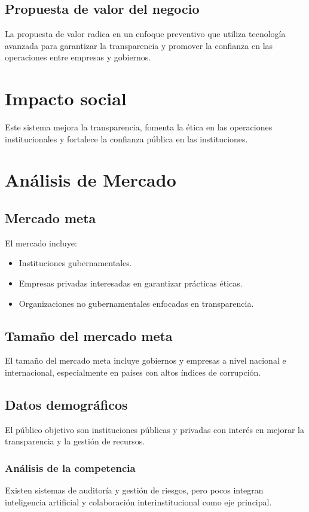 \documentclass[a4paper,12pt]{article}
\begin{document}
\subsection{Propuesta de valor del negocio}
La propuesta de valor radica en un enfoque preventivo que utiliza tecnología avanzada para garantizar la transparencia y promover la confianza en las operaciones entre empresas y gobiernos.

\section{Impacto social}
Este sistema mejora la transparencia, fomenta la ética en las operaciones institucionales y fortalece la confianza pública en las instituciones.

\section{Análisis de Mercado}
\subsection{Mercado meta}
El mercado incluye:
\begin{itemize}
    \item Instituciones gubernamentales.
    \item Empresas privadas interesadas en garantizar prácticas éticas.
    \item Organizaciones no gubernamentales enfocadas en transparencia.
\end{itemize}

\subsection{Tamaño del mercado meta}
El tamaño del mercado meta incluye gobiernos y empresas a nivel nacional e internacional, especialmente en países con altos índices de corrupción.

\subsection{Datos demográficos}
El público objetivo son instituciones públicas y privadas con interés en mejorar la transparencia y la gestión de recursos.

\subsubsection{Análisis de la competencia}
Existen sistemas de auditoría y gestión de riesgos, pero pocos integran inteligencia artificial y colaboración interinstitucional como eje principal.
\end{document}
